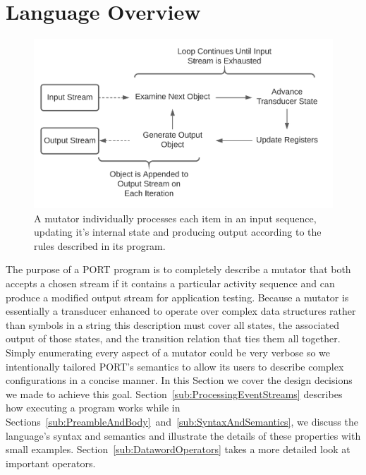 \section{Language Overview}
\label{sec:Overview}

\begin{figure}[h]
  \centering
  \includegraphics[scale=.6]{images/processing}
  \caption{A mutator individually processes each item in an input
  sequence, updating it's internal state and producing output according
  to the rules described in its program.}
  \label{fig:Processing}
\end{figure}

The purpose
of a PORT program is to completely describe a mutator
that both
accepts a chosen stream if it contains a particular
activity sequence and can produce a modified
output stream
for application testing.
Because a mutator is essentially a
transducer enhanced to operate over complex data structures
rather than symbols in a string
this description must cover all states,
the associated output of those states,
and the transition
relation that ties them all together.
Simply enumerating every aspect of a mutator could be very verbose
so we intentionally tailored PORT's semantics to allow its users to
describe complex configurations in a concise manner.
In this Section we cover the design decisions we made
to achieve this goal.
Section~\ref{sub:ProcessingEventStreams} describes how executing a program works
while
in Sections~\ref{sub:PreambleAndBody}~and~\ref{sub:SyntaxAndSemantics},
we discuss the
language's syntax and semantics and illustrate the details
of these properties
with small examples.
Section~\ref{sub:DatawordOperators} takes a more
detailed look at important operators.

